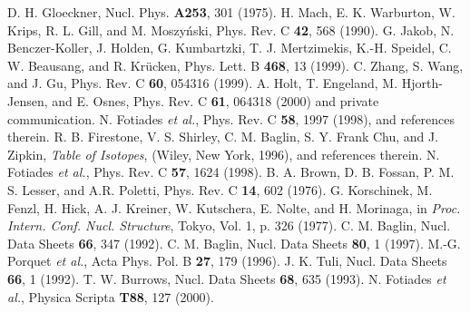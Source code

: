 \begin{references}
 D. H. Gloeckner, Nucl. Phys. {\bf A253}, 301 (1975).
 H. Mach, E. K. Warburton, W. Krips, R. L. Gill, and M.
 Moszy\'{n}ski, Phys. Rev. C {\bf 42}, 568 (1990).
 G. Jakob, N. Benczer-Koller, J. Holden, G. Kumbartzki, T. J.
 Mertzimekis, K.-H. Speidel, C. W. Beausang, and R. Kr\"ucken, Phys. Lett.
 B {\bf 468}, 13 (1999).
 C. Zhang, S. Wang, and J. Gu, Phys. Rev. C {\bf 60}, 054316 (1999).
 A. Holt, T. Engeland, M. Hjorth-Jensen, and E. Osnes, Phys. Rev. C {\bf 61}, 064318 (2000) and private communication.
 N. Fotiades {\it et al.}, Phys. Rev. C {\bf 58}, 1997 (1998), and
 references therein.
 R. B. Firestone, V. S. Shirley, C. M. Baglin, S. Y. Frank Chu,
 and J. Zipkin,  {\it Table of Isotopes}, (Wiley, New York, 1996), and 
 references therein.
 N. Fotiades {\it et al.}, Phys. Rev. C {\bf 57}, 1624 (1998).
 B. A. Brown, D. B. Fossan, P. M. S. Lesser, and A.R. Poletti,
 Phys. Rev. C {\bf 14}, 602 (1976).
 G. Korschinek, M. Fenzl, H. Hick, A. J. Kreiner, W. Kutschera,
 E. Nolte, and H. Morinaga, in {\it Proc. Intern. Conf. Nucl. Structure},
 Tokyo, Vol. 1, p. 326 (1977).
 C. M. Baglin, Nucl. Data Sheets {\bf 66}, 347 (1992). %
 C. M. Baglin, Nucl. Data Sheets {\bf 80},   1 (1997). %
 M.-G. Porquet {\it et al.}, Acta Phys. Pol. B {\bf 27}, 179 (1996).
 J. K. Tuli, Nucl. Data Sheets {\bf 66},   1 (1992). %
 T. W. Burrows, Nucl. Data Sheets {\bf 68}, 635 (1993). %
 N. Fotiades {\it et al.}, Physica Scripta {\bf T88}, 127 (2000).
\end{references}

